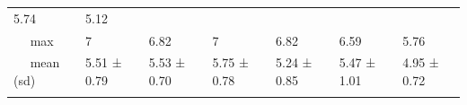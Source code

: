 \documentclass[
  english,
  man,floatsintext]{apa6}
\begin{document}
\begin{longtable}[]{@{}lllllll@{}}
\begin{minipage}[t]{0.11\columnwidth}
5.74\strut
\end{minipage} & \begin{minipage}[t]{0.11\columnwidth}\raggedright
5.12\strut
\end{minipage}\tabularnewline
\begin{minipage}[t]{0.16\columnwidth}\raggedright
~~ max\strut
\end{minipage} & \begin{minipage}[t]{0.11\columnwidth}\raggedright
7\strut
\end{minipage} & \begin{minipage}[t]{0.11\columnwidth}\raggedright
6.82\strut
\end{minipage} & \begin{minipage}[t]{0.11\columnwidth}\raggedright
7\strut
\end{minipage} & \begin{minipage}[t]{0.11\columnwidth}\raggedright
6.82\strut
\end{minipage} & \begin{minipage}[t]{0.11\columnwidth}\raggedright
6.59\strut
\end{minipage} & \begin{minipage}[t]{0.11\columnwidth}\raggedright
5.76\strut
\end{minipage}\tabularnewline
\begin{minipage}[t]{0.16\columnwidth}\raggedright
~~ mean (sd)\strut
\end{minipage} & \begin{minipage}[t]{0.11\columnwidth}\raggedright
5.51 ± 0.79\strut
\end{minipage} & \begin{minipage}[t]{0.11\columnwidth}\raggedright
5.53 ± 0.70\strut
\end{minipage} & \begin{minipage}[t]{0.11\columnwidth}\raggedright
5.75 ± 0.78\strut
\end{minipage} & \begin{minipage}[t]{0.11\columnwidth}\raggedright
5.24 ± 0.85\strut
\end{minipage} & \begin{minipage}[t]{0.11\columnwidth}\raggedright
5.47 ± 1.01\strut
\end{minipage} & \begin{minipage}[t]{0.11\columnwidth}\raggedright
4.95 ± 0.72\strut
\end{minipage}\tabularnewline
\begin{minipage}[t]{0.16\columnwidth}\raggedright

\end{minipage}
\end{longtable}
\end{document}
